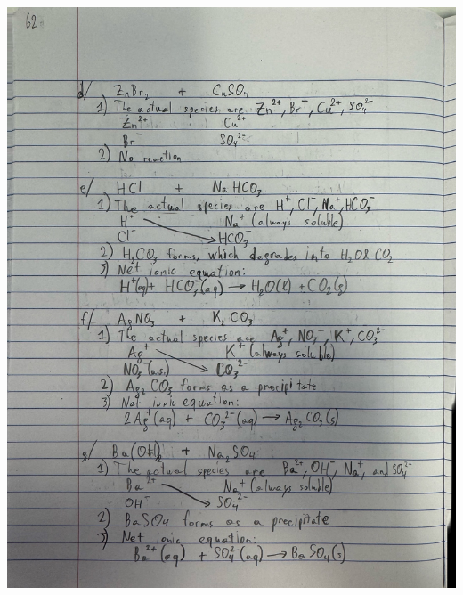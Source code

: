 \documentclass[10pt]{article}
\begin{document}
\begin{center}
                \includegraphics[width=\textwidth, trim={5in 13.5in 3in 5in},clip]{"Answers Images/IMG_6648.jpg"}


\end{center}
\end{document}
